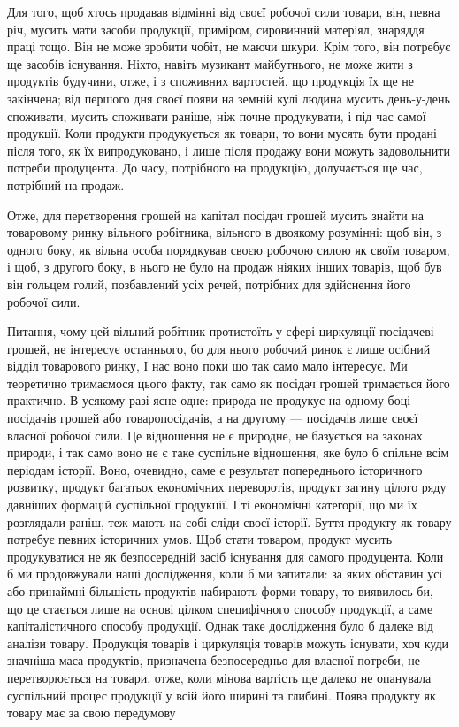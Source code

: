 Для того, щоб хтось продавав відмінні від своєї робочої сили
товари, він, певна річ, мусить мати засоби продукції, приміром,
сировинний матеріял, знаряддя праці тощо. Він не може зробити
чобіт, не маючи шкури. Крім того, він потребує ще засобів існування.
Ніхто, навіть музикант майбутнього, не може жити з
продуктів будучини, отже, і з споживних вартостей, що продукція
їх ще не закінчена; від першого дня своєї появи на земній
кулі людина мусить день-у-день споживати, мусить споживати
раніше, ніж почне продукувати, і під час самої продукції. Коли
продукти продукується як товари, то вони мусять бути продані
після того, як їх випродуковано, і лише після продажу вони
можуть задовольнити потреби продуцента. До часу, потрібного
на продукцію, долучається ще час, потрібний на продаж.

Отже, для перетворення грошей на капітал посідач грошей
мусить знайти на товаровому ринку вільного робітника, вільного
в двоякому розумінні: щоб він, з одного боку, як вільна особа
порядкував своєю робочою силою як своїм товаром, і щоб, з
другого боку, в нього не було на продаж ніяких інших товарів,
щоб був він гольцем голий, позбавлений усіх речей, потрібних
для здійснення його робочої сили.

Питання, чому цей вільний робітник протистоїть у сфері
циркуляції посідачеві грошей, не інтересує останнього, бо для
нього робочий ринок є лише осібний відділ товарового ринку,
І нас воно поки що так само мало інтересує. Ми теоретично тримаємося
цього факту, так само як посідач грошей тримається
його практично. В усякому разі ясне одне: природа не продукує
на одному боці посідачів грошей або товаропосідачів, а на другому
— посідачів лише своєї власної робочої сили. Це відношення
не є природне, не базується на законах природи, і так само воно
не є таке суспільне відношення, яке було б спільне всім періодам
історії. Воно, очевидно, саме є результат попереднього історичного
розвитку, продукт багатьох економічних переворотів, продукт
загину цілого ряду давніших формацій суспільної продукції.
І ті економічні категорії, що ми їх розглядали раніш, теж
мають на собі сліди своєї історії. Буття продукту як товару
потребує певних історичних умов. Щоб стати товаром, продукт
мусить продукуватися не як безпосередній засіб існування для
самого продуцента. Коли б ми продовжували наші дослідження,
коли б ми запитали: за яких обставин усі або принаймні більшість
продуктів набирають форми товару, то виявилось би, що це
стається лише на основі цілком специфічного способу продукції,
а саме капіталістичного способу продукції. Однак таке дослідження
було б далеке від аналізи товару. Продукція товарів і циркуляція
товарів можуть існувати, хоч куди значніша маса продуктів,
призначена безпосередньо для власної потреби, не перетворюється
на товари, отже, коли мінова вартість ще далеко не
опанувала суспільний процес продукції у всій його ширині та
глибині. Поява продукту як товару має за свою передумову
\parbreak{}  %
